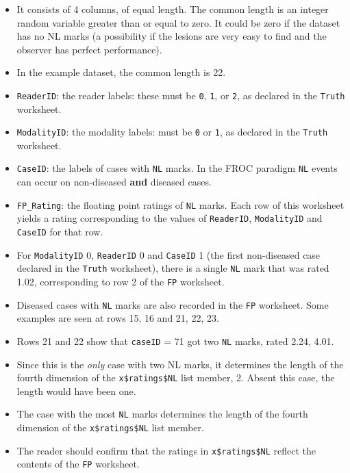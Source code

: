 \documentclass[
]{book}
\providecommand{\tightlist}{%
  \setlength{\itemsep}{0pt}\setlength{\parskip}{0pt}}
\begin{document}
\begin{itemize}
\tightlist
\item
  It consists of 4 columns, of equal length. The common length is an integer random variable greater than or equal to zero. It could be zero if the dataset has no NL marks (a possibility if the lesions are very easy to find and the observer has perfect performance).\\
\item
  In the example dataset, the common length is 22.
\item
  \texttt{ReaderID}: the reader labels: these must be \texttt{0}, \texttt{1}, or \texttt{2}, as declared in the \texttt{Truth} worksheet.
\item
  \texttt{ModalityID}: the modality labels: must be \texttt{0} or \texttt{1}, as declared in the \texttt{Truth} worksheet.
\item
  \texttt{CaseID}: the labels of cases with \texttt{NL} marks. In the FROC paradigm \texttt{NL} events can occur on non-diseased \textbf{and} diseased cases.
\item
  \texttt{FP\_Rating}: the floating point ratings of \texttt{NL} marks. Each row of this worksheet yields a rating corresponding to the values of \texttt{ReaderID}, \texttt{ModalityID} and \texttt{CaseID} for that row.
\item
  For \texttt{ModalityID} 0, \texttt{ReaderID} 0 and \texttt{CaseID} 1 (the first non-diseased case declared in the \texttt{Truth} worksheet), there is a single \texttt{NL} mark that was rated 1.02, corresponding to row 2 of the \texttt{FP} worksheet.
\item
  Diseased cases with \texttt{NL} marks are also recorded in the \texttt{FP} worksheet. Some examples are seen at rows 15, 16 and 21, 22, 23.
\item
  Rows 21 and 22 show that \texttt{caseID} = 71 got two \texttt{NL} marks, rated 2.24, 4.01.
\item
  Since this is the \emph{only} case with two NL marks, it determines the length of the fourth dimension of the \texttt{x\$ratings\$NL} list member, 2. Absent this case, the length would have been one.
\item
  The case with the most \texttt{NL} marks determines the length of the fourth dimension of the \texttt{x\$ratings\$NL} list member.
\item
  The reader should confirm that the ratings in \texttt{x\$ratings\$NL} reflect the contents of the \texttt{FP} worksheet.
\end{itemize}
\end{document}
